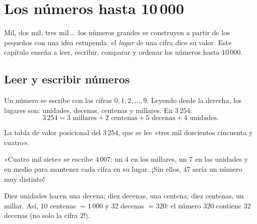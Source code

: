 \chapter{Los números hasta 10\,000}\label{ch:g3:numbers}

Mil, dos mil, tres mil\,\dots\ los números grandes se
construyen a partir de los pequeños con una idea estupenda: el \emph{lugar} de una
cifra dice su valor. Este capítulo enseña a leer, escribir,
comparar y ordenar los números hasta $10\,000$.

\section{Leer y escribir números}

\begin{definition}\label{def:g3:numbers:place}
Un número se escribe con las cifras $0, 1, 2, \dots, 9$. Leyendo desde
la derecha, los lugares son: unidades, decenas, centenas y millares. En
$3\,254$:
\[
3\,254 = 3 \text{ millares} + 2 \text{ centenas} + 5 \text{ decenas}
+ 4 \text{ unidades}.
\]
\end{definition}

\begin{omfigure}

{\small La tabla de valor posicional del $3\,254$, que se lee «tres mil
doscientos cincuenta y cuatro».}
\end{omfigure}

\begin{example}\label{ex:g3:numbers:zero}
«Cuatro mil siete» se escribe $4\,007$: un $4$ en los
millares, un $7$ en las unidades y \emph{} en medio para mantener
cada cifra en su lugar. ¡Sin ellos, $47$ sería un número muy
distinto!
\end{example}

\begin{example}[Cambiar]\label{ex:g3:numbers:exchange}
Diez unidades hacen una decena; diez decenas, una centena; diez centenas,
un millar. Así, $10$ centenas $= 1\,000$ y $32$ decenas
$= 320$: el número $320$ contiene $32$ decenas (no solo la cifra
$2$!).
\end{example}

